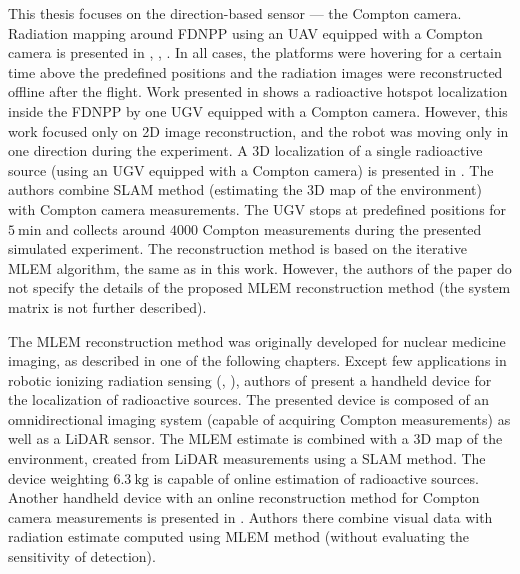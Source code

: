 This thesis focuses on the direction-based sensor --- the Compton camera.
Radiation mapping around \ac{FDNPP} using an \ac{UAV} equipped with a Compton camera is presented in \cite{Jiang2015}, \cite{Mochizuki_2017}, \cite{sato_drone_compton_camera_2018}.
In all cases, the platforms were hovering for a certain time above the predefined positions and the radiation images were reconstructed offline after the flight.
Work presented in \cite{fuku_compton} shows a radioactive hotspot localization inside the \ac{FDNPP} by one \ac{UGV} equipped with a Compton camera.
However, this work focused only on 2D image reconstruction, and the robot was moving only in one direction during the experiment.
A 3D localization of a single radioactive source (using an \ac{UGV} equipped with a Compton camera) is presented in \cite{3D_compton_mobile_robot_2017}.
The authors combine \ac{SLAM} method (estimating the 3D map of the environment) with Compton camera measurements. %
The \ac{UGV} stops at predefined positions for $\SI{5}{\minute}$ and collects around $4000$ Compton measurements during the presented simulated experiment.
The reconstruction method is based on the iterative \ac{MLEM} algorithm, the same as in this work.
However, the authors of the paper do not specify the details of the proposed \ac{MLEM} reconstruction method (the system matrix is not further described).

The \ac{MLEM} reconstruction method was originally developed for nuclear medicine imaging, as described in one of the following chapters.
Except few applications in robotic ionizing radiation sensing (\cite{fuku_compton}, \cite{3D_compton_mobile_robot_2017}), authors of \cite{handheld_mlem_reconstruction}
present a handheld device for the localization of radioactive sources. 
The presented device is composed of an omnidirectional imaging system (capable of acquiring Compton measurements) as well as a \ac{LiDAR} sensor.
The \ac{MLEM} estimate is combined with a 3D map of the environment, created from \ac{LiDAR} measurements using a \ac{SLAM} method.
The device weighting $\SI{6.3}{\kilogram}$ is capable of online estimation of radioactive sources.
Another handheld device with an online reconstruction method for Compton camera measurements is presented in \cite{handheld_visual}.
Authors there combine visual data with radiation estimate computed using \ac{MLEM} method (without evaluating the sensitivity of detection).

